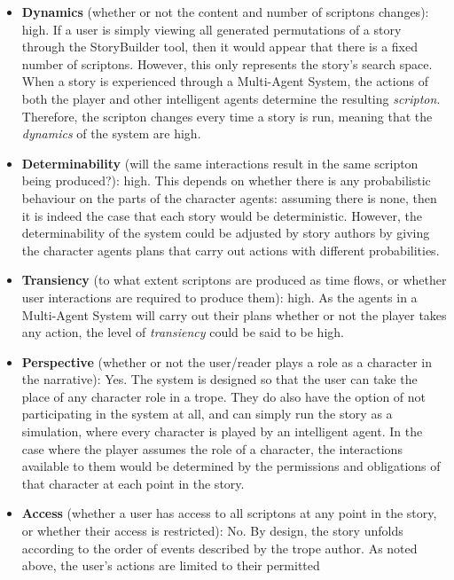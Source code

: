 \documentclass[11pt]{report}
\begin{document}
\begin{itemize}
  \item \textbf{Dynamics} (whether or not the content and number of scriptons
    changes): high. If a user is simply viewing all generated permutations of a story
    through the StoryBuilder tool, then it would appear that there is a fixed
    number of scriptons. However, this only represents the story's search space.
    When a story is experienced through a Multi-Agent System, the actions of
    both the player and other intelligent agents determine the resulting
    \emph{scripton}. Therefore, the scripton changes every time a story is run,
    meaning that the \emph{dynamics} of the system are high.
  \item \textbf{Determinability} (will the same interactions result in the same
    scripton being produced?): high. This depends on whether there is any
    probabilistic behaviour on the parts of the character agents: assuming there
    is none, then it is indeed the case that each story would be deterministic.
    However, the determinability of the system could be adjusted by story
    authors by giving the character agents plans that carry out actions with
    different probabilities.
  \item \textbf{Transiency} (to what extent scriptons are produced as time
    flows, or whether user interactions are required to produce them): high. As the
    agents in a Multi-Agent System will carry out their plans whether or not the
    player takes any action, the level of \emph{transiency} could be said to be high.
  \item \textbf{Perspective} (whether or not the user/reader plays a role as a
    character in the narrative): Yes. The system is designed so that the user can
    take the place of any character role in a trope. They do also have the
    option of not participating in the system at all, and can simply run the
    story as a simulation, where every character is played by an intelligent
    agent. In the case where the player assumes the role of a character, the
    interactions available to them would be determined by the permissions and
    obligations of that character at each point in the story.
  \item \textbf{Access} (whether a user has access to all scriptons at any point
    in the story, or whether their access is restricted): No. By design, the
    story unfolds according to the order of events described by the trope
    author. As noted above, the user's actions are limited to their permitted

\end{itemize}
\end{document}
